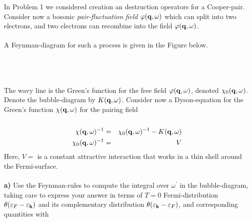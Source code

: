 \begin{problem}
	
In Problem 1 we considered creation an destruction operators for a Cooper-pair. Consider now a bosonic {\it pair-fluctuation field} $\varphi({\bf q}, \omega)$ which can split into two electrons, and two electrons can recombine into the field $\varphi({\bf q}, \omega)$. 
\ \\
\ \\
A Feynman-diagram for such a process is given in the Figure below. 
\ \\
\ \\
\begin{center}
\end{center}
\ \\
\ \\
The wavy line is the Green's function for the free field $\varphi({\bf q},\omega)$, denoted $\chi_0({\bf q}, \omega)$.
Denote the bubble-diagram by $K({\bf q},\omega)$. Consider now a Dyson-equation for the Green's function 
$\chi({\bf q}, \omega)$ for the pairing field
\ \\
\ \\
\begin{eqnarray}
	\chi({\bf q}, \omega)^{-1} & = & \chi_0({\bf q}, \omega)^{-1} - K({\bf q},\omega) \nonumber \\
	\chi_0({\bf q}, \omega)^{-1} & = & V \nonumber
\end{eqnarray} 
Here, $V=$ is a constant attractive interaction that works in a thin shell around the Fermi-surface.  
\ \\
\ \\
{\bf a)} Use the Feynman-rules to compute the integral over $\omega^{\prime}$ in the bubble-diagram, taking care to express your answer in terms of $T=0$ Fermi-distribution $\theta(\varepsilon_F-\varepsilon_{\bf k})$ and its complementary  distribution $\theta(\varepsilon_{\bf k} - \varepsilon_F )$, and corresponding quantities with 

\end{problem}
